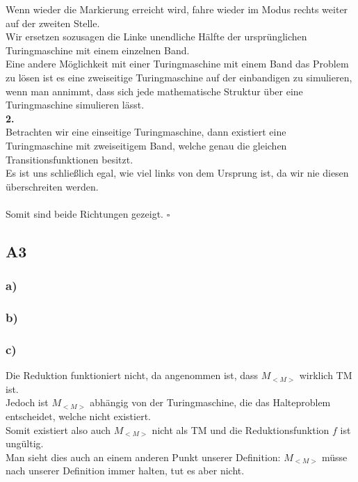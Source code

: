 \documentclass[12pt, a4paper]{article}
\newcommand*{\qed}{\null\nobreak\hfill\ensuremath{\square}}
\begin{document}
Wenn wieder die Markierung erreicht wird, fahre wieder im  Modus rechts weiter auf der zweiten Stelle. \\
Wir ersetzen sozusagen die Linke unendliche Hälfte der ursprünglichen Turingmaschine mit einem einzelnen Band. \\
Eine andere Möglichkeit mit einer Turingmaschine mit einem Band das Problem zu lösen ist es eine zweiseitige Turingmaschine auf der einbandigen zu simulieren, wenn man annimmt, dass sich jede mathematische Struktur über eine Turingmaschine simulieren lässt.\\
\textbf{2. } \textquote{\(\Leftarrow\)} \\
Betrachten wir eine einseitige Turingmaschine, dann existiert eine Turingmaschine mit zweiseitigem Band, welche genau die gleichen Transitionsfunktionen besitzt. \\
Es ist uns schließlich egal, wie viel  links von dem Ursprung ist, da wir nie diesen überschreiten werden. \\
\\
Somit sind beide Richtungen gezeigt. \qed
\subsection*{A3}
\subsubsection*{a)}
\subsubsection*{b)}
\subsubsection*{c)}
Die Reduktion funktioniert nicht, da angenommen ist, dass \(M_{<M>}\) wirklich TM ist. \\
Jedoch ist \(M_{<M>}\) abhängig von der Turingmaschine, die das Halteproblem entscheidet, welche nicht existiert. \\
Somit existiert also auch \(M_{<M>}\) nicht als TM und die Reduktionsfunktion \(f\) ist ungültig. \\
Man sieht dies auch an einem anderen Punkt unserer Definition: \(M_{<M>}\) müsse nach unserer Definition immer halten, tut es aber nicht.
\end{document}
